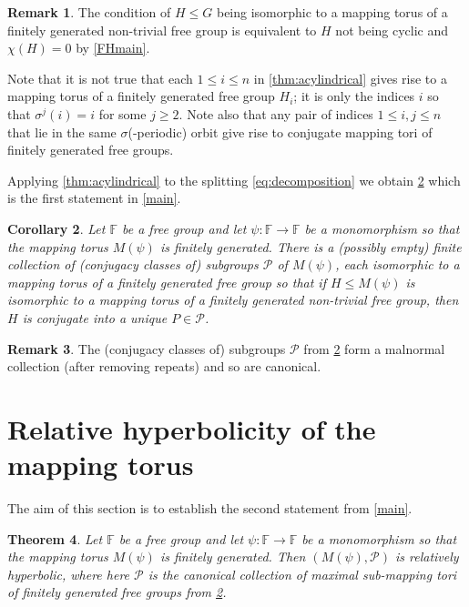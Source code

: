 \documentclass[11pt, a4paper]{amsart}
\newtheorem{theorem}{Theorem}[section]
\newtheorem{corollary}[theorem]{Corollary}
\theoremstyle{definition}
\newtheorem{remark}[theorem]{Remark}
\newcommand{\F}{\mathbb{F}}
\begin{document}
\begin{remark}
The condition of $H\leqslant G$ being isomorphic to a mapping torus of a finitely generated non-trivial free group is equivalent to $H$ not being cyclic and $\chi(H) = 0$ by \cref{FHmain}.
\end{remark}

Note that it is not true that each $1\leqslant i\leqslant n$ in \cref{thm:acylindrical} gives rise to a mapping torus of a finitely generated free group $H_i$; it is only the indices $i$ so that $\sigma^j(i) = i$ for some $j\geqslant 2$. Note also that any pair of indices $1\leqslant i, j\leqslant n$ that lie in the same $\sigma$(-periodic) orbit give rise to conjugate mapping tori of finitely generated free groups.


Applying \cref{thm:acylindrical} to the splitting \eqref{eq:decomposition} we obtain \cref{cor:canonical_collection} which is the first statement in \cref{main}.

\begin{corollary}
\label{cor:canonical_collection}
Let $\F$ be a free group and let $\psi\colon \F\to \F$ be a monomorphism so that the mapping torus $M(\psi)$ is finitely generated. There is a (possibly empty) finite collection of (conjugacy classes of) subgroups $\mathcal{P}$ of $M(\psi)$, each isomorphic to a mapping torus of a finitely generated free group so that if $H\leqslant M(\psi)$ is isomorphic to a mapping torus of a finitely generated non-trivial free group, then $H$ is conjugate into a unique $P\in\mathcal{P}$.
\end{corollary}

\begin{remark}
The (conjugacy classes of) subgroups $\mathcal{P}$ from \cref{cor:canonical_collection} form a malnormal collection (after removing repeats) and so are canonical.
\end{remark}




\section{Relative hyperbolicity of the mapping torus}
\label{sec:rel_hyp_mapping_tori}

The aim of this section is to establish the second statement from \cref{main}.

\begin{theorem}
\label{thm:rel_hyp}
Let $\F$ be a free group and let $\psi\colon \F\to \F$ be a monomorphism so that the mapping torus $M(\psi)$ is finitely generated. Then $(M(\psi), \mathcal{P})$ is relatively hyperbolic, where here $\mathcal{P}$ is the canonical collection of maximal sub-mapping tori of finitely generated free groups from \cref{cor:canonical_collection}.
\end{theorem}
\end{document}
